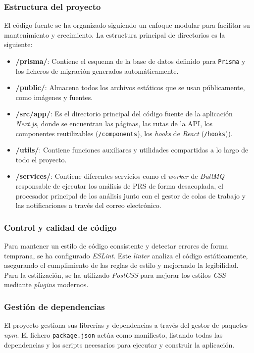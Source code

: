 \subsubsection{Estructura del proyecto}
El código fuente se ha organizado siguiendo un enfoque modular para facilitar su mantenimiento y crecimiento. La estructura principal de directorios es la siguiente:
\begin{itemize}
\item \textbf{/prisma/}: Contiene el esquema de la base de datos definido para \texttt{Prisma} y los ficheros de migración generados automáticamente.
\item \textbf{/public/}: Almacena todos los archivos estáticos que se usan públicamente, como imágenes y fuentes.
\item \textbf{/src/app/}: Es el directorio principal del código fuente de la aplicación \textit{Next.js}, donde se encuentran las páginas, las rutas de la API, los componentes reutilizables (\texttt{/components}), los \textit{hooks} de \textit{React} (\texttt{/hooks})).
\item \textbf{/utils/}: Contiene funciones auxiliares y utilidades compartidas a lo largo de todo el proyecto.
\item \textbf{/services/}: Contiene diferentes servicios como el \textit{worker} de \textit{BullMQ} responsable de ejecutar los análisis de PRS de forma desacoplada, el procesador principal de los análisis junto con el gestor de colas de trabajo y las notificaciones a través del correo electrónico.
\end{itemize}

\subsubsection{Control y calidad de código}
Para mantener un estilo de código consistente y detectar errores de forma temprana, se ha configurado \textit{ESLint}. Este \textit{linter} analiza el código estáticamente, asegurando el cumplimiento de las reglas de estilo y mejorando la legibilidad. Para la estilización, se ha utilizado \textit{PostCSS} para mejorar los estilos \textit{CSS} mediante \textit{plugins} modernos.

\subsubsection{Gestión de dependencias}
El proyecto gestiona sus librerías y dependencias a través del gestor de paquetes \textit{npm}. El fichero \texttt{package.json} actúa como manifiesto, listando todas las dependencias y los scripts necesarios para ejecutar y construir la aplicación.

